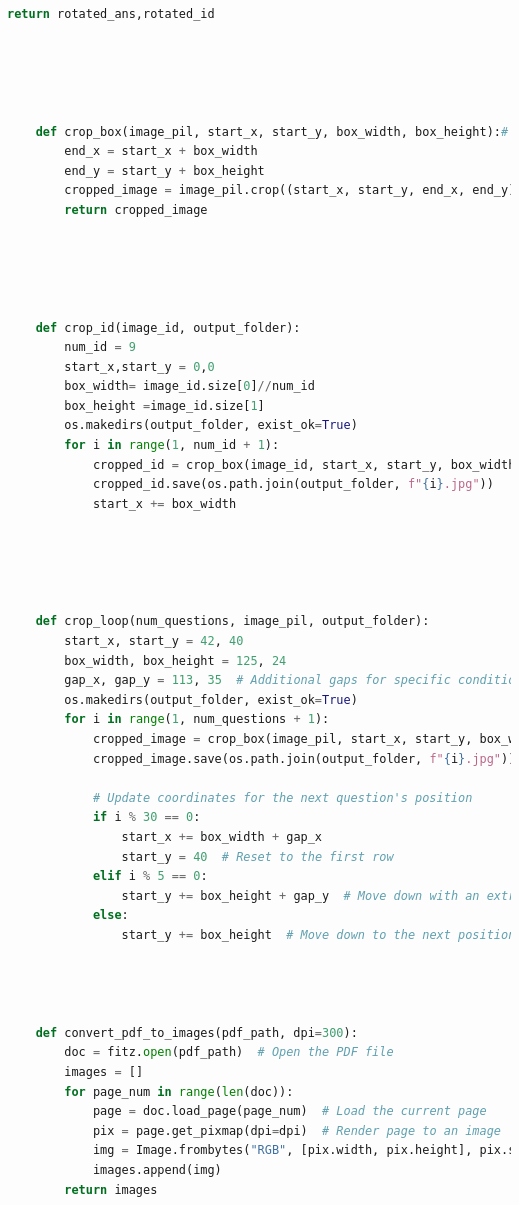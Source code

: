 \documentclass[twocolumn]{article}
\begin{document}
\begin{lstlisting}[language=Python, caption=crop\_pdf\_input.py]
        return rotated_ans,rotated_id
    
    
    
    
    
    def crop_box(image_pil, start_x, start_y, box_width, box_height):# Function to crop the image
        end_x = start_x + box_width
        end_y = start_y + box_height
        cropped_image = image_pil.crop((start_x, start_y, end_x, end_y))
        return cropped_image
    
    
    
    
    
    def crop_id(image_id, output_folder):
        num_id = 9
        start_x,start_y = 0,0
        box_width= image_id.size[0]//num_id
        box_height =image_id.size[1]
        os.makedirs(output_folder, exist_ok=True)
        for i in range(1, num_id + 1):
            cropped_id = crop_box(image_id, start_x, start_y, box_width, box_height)
            cropped_id.save(os.path.join(output_folder, f"{i}.jpg"))
            start_x += box_width
    
    
    
    
    
    def crop_loop(num_questions, image_pil, output_folder):
        start_x, start_y = 42, 40
        box_width, box_height = 125, 24
        gap_x, gap_y = 113, 35  # Additional gaps for specific conditions
        os.makedirs(output_folder, exist_ok=True)
        for i in range(1, num_questions + 1):
            cropped_image = crop_box(image_pil, start_x, start_y, box_width, box_height)
            cropped_image.save(os.path.join(output_folder, f"{i}.jpg"))
            
            # Update coordinates for the next question's position
            if i % 30 == 0:
                start_x += box_width + gap_x
                start_y = 40  # Reset to the first row
            elif i % 5 == 0:
                start_y += box_height + gap_y  # Move down with an extra gap every 5th question
            else:
                start_y += box_height  # Move down to the next position
        
    
    
    
    def convert_pdf_to_images(pdf_path, dpi=300):
        doc = fitz.open(pdf_path)  # Open the PDF file
        images = []
        for page_num in range(len(doc)):
            page = doc.load_page(page_num)  # Load the current page
            pix = page.get_pixmap(dpi=dpi)  # Render page to an image
            img = Image.frombytes("RGB", [pix.width, pix.height], pix.samples)
            images.append(img)
        return images
    

\end{lstlisting}
\end{document}
